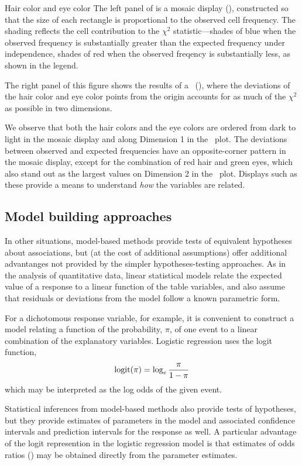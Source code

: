 \begin{Example}[haireye0]{Hair color and eye color}
The left panel of  is a mosaic display
(), constructed so that the size of each rectangle
is proportional to the observed cell frequency. The shading
reflects the cell contribution to the \(\chi^2\) statistic---shades of blue
when the observed frequency is substantially greater than the 
expected frequency under independence, shades of red when the observed freqency
is substantially less, as shown in the legend.

The right panel of this figure shows the results of 
a \CA\ (), where the deviations of the hair color and eye
color points from the origin accounts for as much of the \(\chi^2\)
as possible in two dimensions.

We observe that both the hair colors and the eye colors
are ordered from dark to light in the mosaic display and along
Dimension 1 in the \CA\ plot.  The deviations between observed
and expected frequencies have an opposite-corner pattern in the
mosaic display, except for the combination of red hair and green
eyes, which also stand out as the largest values on Dimension 2
in the \CA\ plot.
Displays such as these provide a means to understand \emph{how}
the variables are related.
\end{Example}
 
\subsection{Model building approaches}
In other situations, model-based methods provide tests of equivalent
hypotheses about associations, but (at the cost of additional assumptions)
offer additional advantanges
not provided by the simpler hypotheses-testing approaches.
As in the analysis of quantitative data, linear statistical models
relate the expected value of a response to a linear function of
the table variables, and also assume that residuals or deviations
from the model follow a known parametric form.

For a dichotomous response variable, for example, it is convenient to
construct a model relating a function of the probability, $\pi$,
of one event to a linear combination of the explanatory variables.
Logistic regression uses the logit function,
\begin{equation*}
 \logit ( \pi ) = \log_e \frac { \pi } {1 - \pi}
\end{equation*}
which may be interpreted as the log odds of the given event.

Statistical inferences from model-based methods also provide tests of
hypotheses, but they provide estimates of parameters in the model
and associated confidence intervals and prediction intervals for the 
response as well.  A particular advantage of the logit represention
in the logistic regression model is that estimates of odds ratios
()
may be obtained directly from the parameter estimates.

